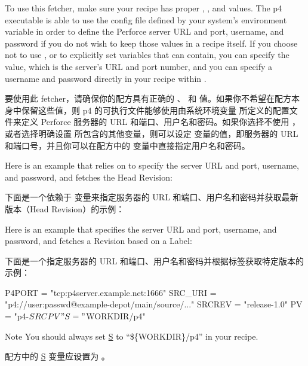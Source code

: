 To use this fetcher, make sure your recipe has proper , , and  values. The p4 executable is able to use the config file defined by your system's  environment variable in order to define the Perforce server URL and port, username, and password if you do not wish to keep those values in a recipe itself. If you choose not to use , or to explicitly set variables that  can contain, you can specify the  value, which is the server's URL and port number, and you can specify a username and password directly in your recipe within .

要使用此 fetcher，请确保你的配方具有正确的 、 和  值。如果你不希望在配方本身中保留这些值，则 p4 的可执行文件能够使用由系统环境变量  所定义的配置文件来定义 Perforce 服务器的 URL 和端口、用户名和密码。如果你选择不使用 ，或者选择明确设置  所包含的其他变量，则可以设定  变量的值，即服务器的 URL 和端口号，并且你可以在配方中的  变量中直接指定用户名和密码。

Here is an example that relies on  to specify the server URL and port, username, and password, and fetches the Head Revision:

下面是一个依赖于  变量来指定服务器的 URL 和端口、用户名和密码并获取最新版本（Head Revision）的示例：


Here is an example that specifies the server URL and port, username, and password, and fetches a Revision based on a Label:

下面是一个指定服务器的 URL 和端口、用户名和密码并根据标签获取特定版本的示例：

\begin{pyglist}
P4PORT = "tcp:p4server.example.net:1666"
SRC_URI = "p4://user:passwd@example-depot/main/source/..."
SRCREV = "release-1.0"
PV = "p4-${SRCPV}"
S = "${WORKDIR}/p4"
\end{pyglist}

\medskip
\begin{noteblock}{Note}%
You should always set \href{https://docs.yoctoproject.org/ref-manual/variables.html#term-S}{S} to ``\$\{WORKDIR\}/p4'' in your recipe.

\medskip
配方中的 \href{https://docs.yoctoproject.org/ref-manual/variables.html#term-S}{S} 变量应设置为 。
\end{noteblock}

